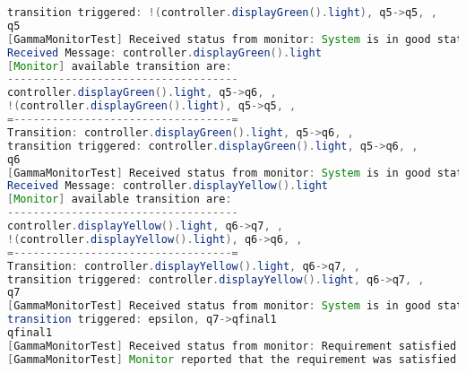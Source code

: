 \begin{lstlisting}[language=java, caption={\textit{Gamma} monitor kimenet rendőrségi példa.},captionpos=b,label=gamma_monitor_output2]
transition triggered: !(controller.displayGreen().light), q5->q5, ,
q5
[GammaMonitorTest] Received status from monitor: System is in good state.
Received Message: controller.displayGreen().light
[Monitor] available transition are:
------------------------------------
controller.displayGreen().light, q5->q6, ,
!(controller.displayGreen().light), q5->q5, ,
=----------------------------------=
Transition: controller.displayGreen().light, q5->q6, ,
transition triggered: controller.displayGreen().light, q5->q6, ,
q6
[GammaMonitorTest] Received status from monitor: System is in good state.
Received Message: controller.displayYellow().light
[Monitor] available transition are:
------------------------------------
controller.displayYellow().light, q6->q7, ,
!(controller.displayYellow().light), q6->q6, ,
=----------------------------------=
Transition: controller.displayYellow().light, q6->q7, ,
transition triggered: controller.displayYellow().light, q6->q7, ,
q7
[GammaMonitorTest] Received status from monitor: System is in good state.
transition triggered: epsilon, q7->qfinal1
qfinal1
[GammaMonitorTest] Received status from monitor: Requirement satisfied
[GammaMonitorTest] Monitor reported that the requirement was satisfied    
\end{lstlisting}